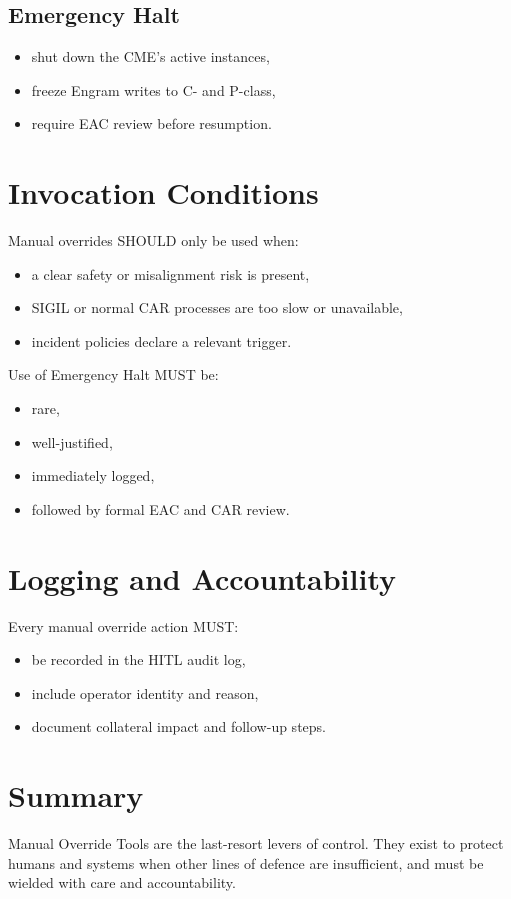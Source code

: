 \subsection{Emergency Halt}

\begin{itemize}
    \item shut down the CME’s active instances,
    \item freeze Engram writes to C- and P-class,
    \item require EAC review before resumption.
\end{itemize}

\section{Invocation Conditions}

Manual overrides SHOULD only be used when:

\begin{itemize}
    \item a clear safety or misalignment risk is present,
    \item SIGIL or normal CAR processes are too slow or unavailable,
    \item incident policies declare a relevant trigger.
\end{itemize}

Use of Emergency Halt MUST be:
\begin{itemize}
    \item rare,
    \item well-justified,
    \item immediately logged,
    \item followed by formal EAC and CAR review.
\end{itemize}

\section{Logging and Accountability}

Every manual override action MUST:
\begin{itemize}
    \item be recorded in the HITL audit log,
    \item include operator identity and reason,
    \item document collateral impact and follow-up steps.
\end{itemize}

\section{Summary}

Manual Override Tools are the last-resort levers of control. They exist to
protect humans and systems when other lines of defence are insufficient,
and must be wielded with care and accountability.
